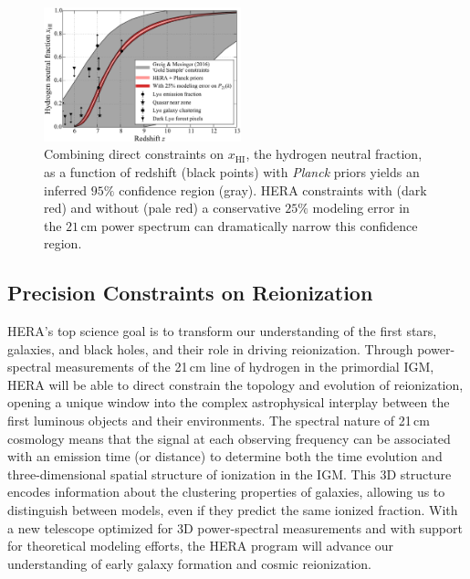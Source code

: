 \documentclass[preprint,11pt]{aastex}
\begin{document}
\begin{figure}[h!]
\centering
    \includegraphics[width=0.51\textwidth,clip]{plots/ionHist.pdf}
  \caption{Combining direct constraints on $x_\text{HI}$, the hydrogen neutral fraction, as a function of redshift (black points) with \emph{Planck} priors yields
an inferred $95\%$ confidence region (gray).  HERA constraints with (dark red) and without (pale red) 
a conservative $25\%$ modeling error in the $21\,\textrm{cm}$ power spectrum can dramatically narrow this confidence region.}
	\label{fig:IonHist}
\end{figure} 


\subsection{Precision Constraints on Reionization}
\label{sec:EoRPowerSpectra}

\noindent HERA's top science goal is to transform our understanding of the first stars, galaxies, 
and black holes, and their role in driving reionization. 
Through power-spectral measurements of the 21\,cm line of hydrogen in the primordial IGM,
HERA will be able to direct constrain the topology and evolution of reionization, 
opening a unique window into the complex astrophysical interplay between the 
first luminous objects and their environments.
The spectral nature of 21\,cm cosmology means that 
the signal at each observing frequency can be associated with an emission time (or distance) to determine both the time evolution
and three-dimensional spatial structure of ionization in the IGM.
This 3D structure encodes information about the clustering properties of galaxies,
allowing us to distinguish between models, even if they predict the same ionized fraction. 
With a new telescope optimized for 3D power-spectral measurements and with support for theoretical
modeling efforts, the HERA program will advance our understanding of early galaxy formation and cosmic reionization.
\end{document}
